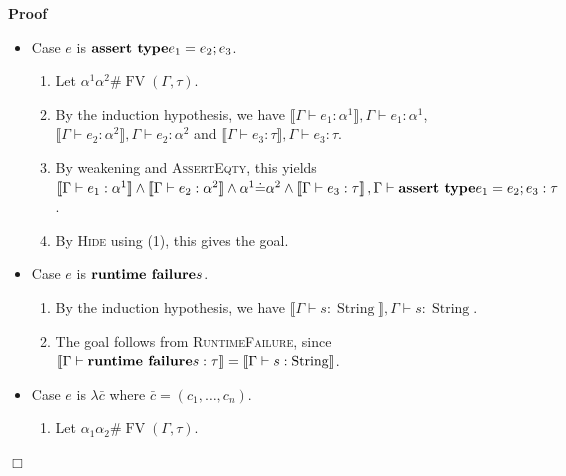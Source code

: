 \documentclass{article}
\newcommand{\tmname}[1]{\textsc{#1}}
\newcommand{\tmop}[1]{\ensuremath{\operatorname{#1}}}
\newcommand{\tmstrong}[1]{\textbf{#1}}
\newenvironment{proof}{\noindent\textbf{Proof\ }}{\hspace*{\fill}$\Box$\medskip}
\begin{document}
\begin{proof}
\begin{itemize}
\begin{enumerate}
      \item By {\tmname{Hide}} using (1), this gives the goal.
    \end{enumerate}
    \item Case $e$ is $\text{{\tmstrong{assert type}}} e_1 = e_2 ; e_3$.
    \begin{enumerate}
      \item Let $\alpha^1 \alpha^2 \# \tmop{FV} (\Gamma, \tau)$.
      
      \item By the induction hypothesis, we have $\llbracket \Gamma \vdash e_1
      : \alpha^1 \rrbracket, \Gamma \vdash e_1 : \alpha^1$, $\llbracket \Gamma
      \vdash e_2 : \alpha^2 \rrbracket, \Gamma \vdash e_2 : \alpha^2$ and
      $\llbracket \Gamma \vdash e_3 : \tau \rrbracket, \Gamma \vdash e_3 :
      \tau$.
      
      \item By weakening and {\tmname{AssertEqty}}, this yields $\llbracket
      \Gamma \vdash e_1 : \alpha^1 \rrbracket \wedge \llbracket \Gamma \vdash
      e_2 : \alpha^2 \rrbracket \wedge \alpha^1 \dot{=} \alpha^2 \wedge
      \left\llbracket \Gamma \vdash e_3 : {\nobreak} \tau \right\rrbracket,
      \Gamma \vdash \text{{\tmstrong{assert type}}} e_1 = e_2 ; e_3 : \tau$.
      
      \item By {\tmname{Hide}} using (1), this gives the goal.
    \end{enumerate}
    \item Case $e$ is $\text{{\tmstrong{runtime failure}}} s$.
    \begin{enumerate}
      \item By the induction hypothesis, we have $\llbracket \Gamma \vdash s :
      \tmop{String} \rrbracket, \Gamma \vdash s : \tmop{String}$.
      
      \item The goal follows from {\tmname{RuntimeFailure}}, since
      $\left\llbracket \Gamma \vdash \text{{\tmstrong{runtime failure}}} s :
      {\nobreak} \tau \right\rrbracket = \llbracket \Gamma \vdash s :
      \tmop{String} \rrbracket$.
    \end{enumerate}
    \item Case $e$ is $\lambda \bar{c}$ where $\bar{c} = (c_1, \ldots, c_n)$.
    \begin{enumerate}
      \item Let $\alpha_1 \alpha_2 \# \tmop{FV} (\Gamma, \tau)$.
      

\end{enumerate}
\end{itemize}
\end{proof}
\end{document}
